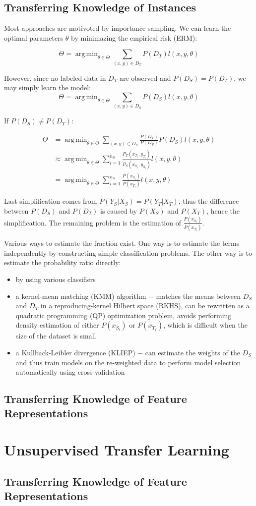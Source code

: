 \documentclass[a4paper,twocolumn]{article}
\DeclareMathOperator*{\argmin}{arg\,min}
\begin{document}
\subsection{Transferring Knowledge of Instances}
Most approaches are motivoted by importance sampling. We can learn the optimal parameters $\theta$ by minimazing the empirical risk (ERM):

\[
    \Theta = \argmin_{\theta \in \Theta} \sum_{(x,y) \in D_T} P(D_T)l(x, y, \theta)
\]

However, since no labeled data in $D_T$ are observed and $P(D_S) = P(D_T)$, we may simply learn the model:
\[
    \Theta = \argmin_{\theta \in \Theta} \sum_{(x,y) \in D_S} P(D_S)l(x, y, \theta)
\]

If $P(D_S) \ne P(D_T)$:

\begin{align*}
    \Theta &= \argmin_{\theta \in \Theta} \sum_{(x,y) \in D_S} \frac{P(D_T)}{P(D_S)}P(D_S)l(x, y, \theta) \\
           &\approx \argmin_{\theta \in \Theta} \sum_{i = 1}^{n_S} \frac{P_T(x_{T_i}, y_{T_i})}{P_S(x_{S_i}, y_{S_i})}l(x, y, \theta) \\
           &= \argmin_{\theta \in \Theta} \sum_{i = 1}^{n_S} \frac{P(x_{S_i})}{P(x_{T_i})}l(x, y, \theta)
\end{align*}

Last simplification comes from $P(Y_S|X_S) = P(Y_T|X_T)$, thus the difference between $P(D_S)$ and $P(D_T)$ is caused by $P(X_S)$ and $P(X_T)$, hence the simplification. The remaining problem is the estimation of $\frac{P(x_{S_i})}{P(x_{T_i})}$.

Various ways to estimate the fraction exist. One way is to estimate the terms independently by constructing simple classification problems. The other way is to estimate the probability ratio directly:
\begin{itemize}
    \item by using various classifiers
    \item a kernel-mean matching (KMM) algorithm $-$ matches the means between $D_S$ and $D_T$ in a reproducing-kernel Hilbert space (RKHS), can be rewritten as a quadratic programming (QP) optimization problem, avoids performing density estimation of either $P(x_{S_i})$ or $P(x_{T_I})$, which is difficult when the size of the dataset is small
    \item a Kullback-Leibler divergence (KLIEP) $-$ can estimate the weights of the $D_S$ and thus train models on the re-weighted data to perform model selection automatically using cross-validation
\end{itemize}

\subsection{Transferring Knowledge of Feature Representations}

\section{Unsupervised Transfer Learning}
\subsection{Transferring Knowledge of Feature Representations}
\end{document}
